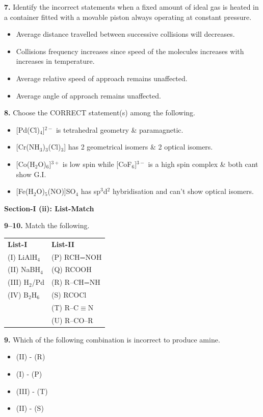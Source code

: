 \documentclass[10pt,twocolumn]{extarticle}
\renewcommand{\arraystretch}{1.15}
\newenvironment{qoptions}{\begin{itemize}[leftmargin=1.8em,itemsep=2pt,topsep=2pt,label={}]}{\end{itemize}}
\newcommand{\opt}[2]{\item[({#1})] {#2}}
\newcommand{\subsectionhdr}[1]{\par\vspace{3pt}\noindent\textbf{#1}\par\vspace{2pt}}
\begin{document}
\textbf{7.} Identify the incorrect statements when a fixed amount of ideal gas is heated in a container fitted with a movable piston always operating at constant pressure.

\begin{qoptions}
\opt{A}{Average distance travelled between successive collisions will decreases.}
\opt{B}{Collisions frequency increases since speed of the molecules increases with increases in temperature.}
\opt{C}{Average relative speed of approach remains unaffected.}
\opt{D}{Average angle of approach remains unaffected.}
\end{qoptions}

\textbf{8.} Choose the CORRECT statement(s) among the following.

\begin{qoptions}
\opt{A}{[Pd(Cl)$_4$]$^{2-}$ is tetrahedral geometry \& paramagnetic.}
\opt{B}{[Cr(NH$_3$)$_3$(Cl)$_3$] has 2 geometrical isomers \& 2 optical isomers.}
\opt{C}{[Co(H$_2$O)$_6$]$^{3+}$ is low spin while [CoF$_6$]$^{3-}$ is a high spin complex \& both cant show G.I.}
\opt{D}{[Fe(H$_2$O)$_5$(NO)]SO$_4$ has sp$^3$d$^2$ hybridisation and can't show optical isomers.}
\end{qoptions}

\subsectionhdr{Section-I (ii): List-Match}

\textbf{9--10.} Match the following.

\begin{center}
\renewcommand{\arraystretch}{1.25}
\begin{tabular}{@{}ll@{}}
\textbf{List-I} & \textbf{List-II}\\
(I) LiAlH$_4$ & (P) RCH=NOH\\
(II) NaBH$_4$ & (Q) RCOOH\\
(III) H$_2$/Pd & (R) R--CH=NH\\
(IV) B$_2$H$_6$ & (S) RCOCl\\
& (T) R--C$\equiv$N\\
& (U) R--CO--R\\
\end{tabular}
\renewcommand{\arraystretch}{1.15}
\end{center}

\textbf{9.} Which of the following combination is incorrect to produce amine.

\begin{qoptions}
\opt{A}{(II) - (R)}
\opt{B}{(I) - (P)}
\opt{C}{(III) - (T)}
\opt{D}{(II) - (S)}
\end{qoptions}
\end{document}
